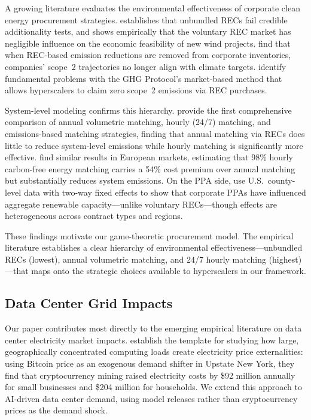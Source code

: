 \documentclass[a4paper,fleqn,longmktitle]{cas-sc}
\begin{document}
A growing literature evaluates the environmental effectiveness of corporate clean energy procurement strategies. \citet{gillenwater2008a} establishes that unbundled RECs fail credible additionality tests, and \citet{gillenwater2014} shows empirically that the voluntary REC market has negligible influence on the economic feasibility of new wind projects. \citet{bjorn2022} find that when REC-based emission reductions are removed from corporate inventories, companies' scope~2 trajectories no longer align with climate targets. \citet{brander2018} identify fundamental problems with the GHG Protocol's market-based method that allows hyperscalers to claim zero scope~2 emissions via REC purchases.
 
System-level modeling confirms this hierarchy. \citet{xu2025does} provide the first comprehensive comparison of annual volumetric matching, hourly (24/7) matching, and emissions-based matching strategies, finding that annual matching via RECs does little to reduce system-level emissions while hourly matching is significantly more effective. \citet{riepin2024} find similar results in European markets, estimating that 98\% hourly carbon-free energy matching carries a 54\% cost premium over annual matching but substantially reduces system emissions. On the PPA side, \citet{backstrom2023} use U.S.\ county-level data with two-way fixed effects to show that corporate PPAs have influenced aggregate renewable capacity---unlike voluntary RECs---though effects are heterogeneous across contract types and regions.
 
These findings motivate our game-theoretic procurement model. The empirical literature establishes a clear hierarchy of environmental effectiveness---unbundled RECs (lowest), annual volumetric matching, and 24/7 hourly matching (highest)---that maps onto the strategic choices available to hyperscalers in our framework.
 
\subsection{Data Center Grid Impacts}
 
Our paper contributes most directly to the emerging empirical literature on data center electricity market impacts. \citet{benetton2023} establish the template for studying how large, geographically concentrated computing loads create electricity price externalities: using Bitcoin price as an exogenous demand shifter in Upstate New York, they find that cryptocurrency mining raised electricity costs by \$92 million annually for small businesses and \$204 million for households. We extend this approach to AI-driven data center demand, using model releases rather than cryptocurrency prices as the demand shock.
 
\end{document}
